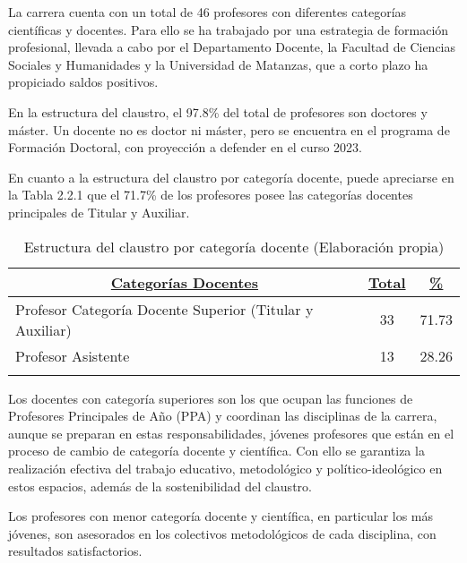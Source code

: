 La carrera cuenta con un total de 46 profesores con diferentes categorías científicas y docentes. Para ello se ha trabajado por una estrategia de formación profesional, llevada a cabo por el Departamento Docente, la Facultad de Ciencias Sociales y Humanidades y la Universidad de Matanzas, que a corto plazo ha propiciado saldos positivos.

En la estructura del claustro, el 97.8\% del total de profesores son doctores y máster. Un docente no es doctor ni máster, pero se encuentra en el programa de Formación Doctoral, con proyección a defender en el curso 2023.

En cuanto a la estructura del claustro por categoría docente, puede apreciarse en la Tabla 2.2.1 que el 71.7\% de los profesores posee las categorías docentes principales de Titular y Auxiliar.

\begin{longtable}{|p{12cm}|c|c|}
	\hline
	\multicolumn{1}{|c|}{ \underline{\textbf{Categorías Docentes}}} & \underline{\textbf{Total}} & \underline{\textbf{\%}} \\ \hline
	Profesor Categoría Docente Superior (Titular y Auxiliar) &33  & 71.73 \\ \hline
	Profesor Asistente & 13 & 28.26 \\ \hline
	\caption{Estructura del claustro por categoría docente (Elaboración propia)}
\end{longtable}

Los docentes con categoría superiores son los que ocupan las funciones de Profesores Principales de Año (PPA) y coordinan las disciplinas de la carrera, aunque se preparan en estas responsabilidades, jóvenes profesores que están en el proceso de cambio de categoría docente y científica. Con ello se garantiza la realización efectiva del trabajo educativo, metodológico y político-ideológico en estos espacios, además de la sostenibilidad del claustro.

Los profesores con menor categoría docente y científica, en particular los más jóvenes, son asesorados en los colectivos metodológicos de cada disciplina, con resultados satisfactorios.